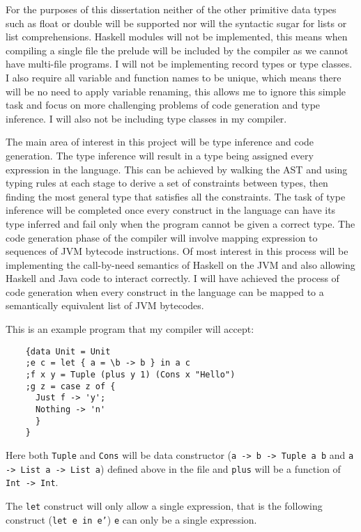 \documentclass[12pt,a4paper,twoside]{article}
\begin{document}
  For the purposes of this dissertation neither of the other primitive data types such as float or double will be supported nor will the syntactic sugar for lists
  or list comprehensions.
  Haskell modules will not be implemented, this means when compiling a single file the prelude will be included by the compiler as we cannot have multi-file programs.
  I will not be implementing record types or type classes. I also require all variable and function names to be unique, which means there will be no need to apply
  variable renaming, this allows me to ignore this simple task and focus on more challenging problems of code generation and type inference. I will also not be including type classes in my compiler.

  The main area of interest in this project will be type inference and code generation. The type inference will result in 
  a type being assigned 
  every expression in the language. This can be achieved by walking the AST and using typing rules at each stage to derive 
  a set of constraints between types, then finding the most general type that satisfies all the constraints. 
  The task of type inference will be completed once every construct in the language can have its type inferred 
  and fail only when the program cannot be given a correct type.
  The code generation phase of the compiler will involve mapping expression to sequences of JVM bytecode instructions.
  Of most interest in this process will be implementing the call-by-need semantics of Haskell on the JVM and also allowing Haskell 
  and Java code to interact correctly. I will have achieved the process of code generation when every construct in the language
  can be mapped to a semantically equivalent list of JVM bytecodes.

  This is an example program that my compiler will accept:

  \begin{verbatim}
    {data Unit = Unit
    ;e c = let { a = \b -> b } in a c
    ;f x y = Tuple (plus y 1) (Cons x "Hello")
    ;g z = case z of {
      Just f -> 'y';
      Nothing -> 'n'
      }
    }
  \end{verbatim}

  Here both \texttt{Tuple} and \texttt{Cons} will be data constructor (\texttt{a -> b -> Tuple a b} and \texttt{a -> List a -> List a})
  defined above in the file and \texttt{plus} will be a function of \texttt{Int -> Int}.

  The \texttt{let} construct will only allow a single expression, that is the following construct (\texttt{let e in e'})
  \texttt{e} can only be a single expression.
\end{document}
